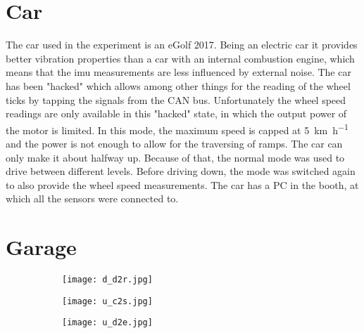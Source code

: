 \section{Car}
The car used in the experiment is an eGolf 2017.
Being an electric car it provides better vibration properties than a car with an internal combustion engine, which means that the \gls{imu} measurements are less influenced by external noise.
The car has been "hacked" which allows among other things for the reading of the wheel ticks by tapping the signals from the CAN bus.
Unfortunately the wheel speed readings are only available in this "hacked" state, in which the output power of the motor is limited.
In this mode, the maximum speed is capped at \SI{5}{\kilo\metre\per\hour} and the power is not enough to allow for the traversing of ramps.
The car can only make it about halfway up.
Because of that, the normal mode was used to drive between different levels.
Before driving down, the mode was switched again to also provide the wheel speed measurements.
The car has a PC in the booth, at which all the sensors were connected to.



\section{Garage}
\begin{figure}
	\begin{subfigure}{.3\linewidth}
		\centering
		\texttt{[image: d\_d2r.jpg]}
	\end{subfigure}
	\hfill
	\begin{subfigure}{.3\linewidth}
		\centering
		\texttt{[image: u\_c2s.jpg]}
	\end{subfigure}
	\hfill
	\begin{subfigure}{.3\linewidth}
		\centering
		\texttt{[image: u\_d2e.jpg]}
	\end{subfigure}
\end{figure}